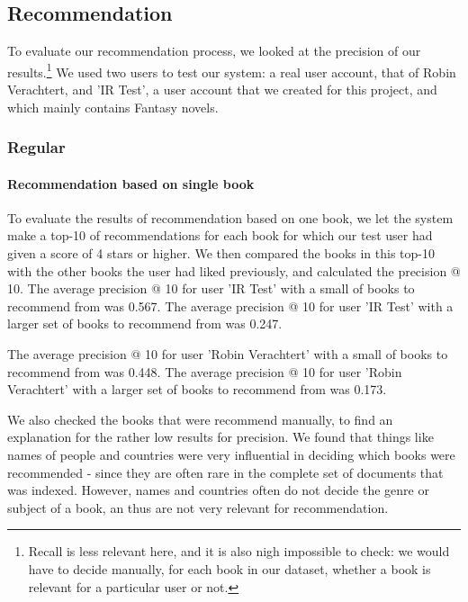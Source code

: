 \documentclass[10pt,a4paper]{paper}
\begin{document}
\subsection{Recommendation}

To evaluate our recommendation process, we looked at the precision of our results.\footnote{Recall is less relevant here, and it is also nigh impossible to check: we would have to decide manually, for each book in our dataset, whether a book is relevant for a particular user or not.} We used two users to test our system: a real user account, that of Robin Verachtert, and 'IR Test', a user account that we created for this project, and which mainly contains Fantasy novels.

\subsubsection{Regular}

\paragraph{Recommendation based on single book}
To evaluate the results of recommendation based on one book, we let the system make a top-10 of recommendations for each book for which our test user had given a score of 4 stars or higher. We then compared the books in this top-10 with the other books the user had liked previously, and calculated the precision @ 10.
The average precision @ 10 for user 'IR Test' with a small of books to recommend from was 0.567. 
The average precision @ 10 for user 'IR Test' with a larger set of books to recommend from was 0.247.

The average precision @ 10 for user 'Robin Verachtert' with a small of books to recommend from was 0.448. 
The average precision @ 10 for user 'Robin Verachtert' with a larger set of books to recommend from was 0.173.

We also checked the books that were recommend manually, to find an explanation for the rather low results for precision. We found that things like names of people and countries were very influential in deciding which books were recommended - since they are often rare in the complete set of documents that was indexed. However, names and countries often do not decide the genre or subject of a book, an thus are not very relevant for recommendation. 
\end{document}
